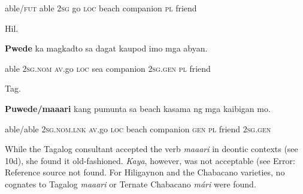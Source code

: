 \begin{stylelsIMT}
able/\textsc{fut} able 2\textsc{sg} go \textsc{loc} beach companion \textsc{pl} friend
\end{stylelsIMT}

\begin{listWWNumiileveli}
\item 
\begin{listWWNumiilevelii}
\item 
\begin{stylelsLanginfo}
Hil.
\end{stylelsLanginfo}
\end{listWWNumiilevelii}
\end{listWWNumiileveli}
\begin{stylelsSourceline}
\textbf{Pwede} ka magkadto sa dagat kaupod imo mga abyan\textup{.}
\end{stylelsSourceline}

\begin{stylelsIMT}
able 2\textsc{sg}.\textsc{nom av.}go \textsc{loc} sea companion 2\textsc{sg.gen pl} friend
\end{stylelsIMT}

\begin{listWWNumiileveli}
\item 
\begin{listWWNumiilevelii}
\item 
\begin{stylelsLanginfo}
Tag.
\end{stylelsLanginfo}
\end{listWWNumiilevelii}
\end{listWWNumiileveli}
\begin{stylelsSourceline}
\textbf{Puwede/maaari} kang pumunta sa beach kasama ng mga kaibigan mo.
\end{stylelsSourceline}

\begin{stylelsIMT}
able/able 2\textsc{sg.nom.lnk av}.go \textsc{loc} beach companion \textsc{gen pl} friend 2\textsc{sg.gen}
\end{stylelsIMT}

\begin{styleStandard}
While the Tagalog consultant accepted the verb \textit{maaari} in deontic contexts (see 10d), she found it old-fashioned. \textit{Kaya}, however, was not acceptable (see Error: Reference source not found. For Hiligaynon and the Chabacano varieties, no cognates to Tagalog \textit{maaari} or Ternate Chabacano \textit{mári} were found.
\end{styleStandard}

